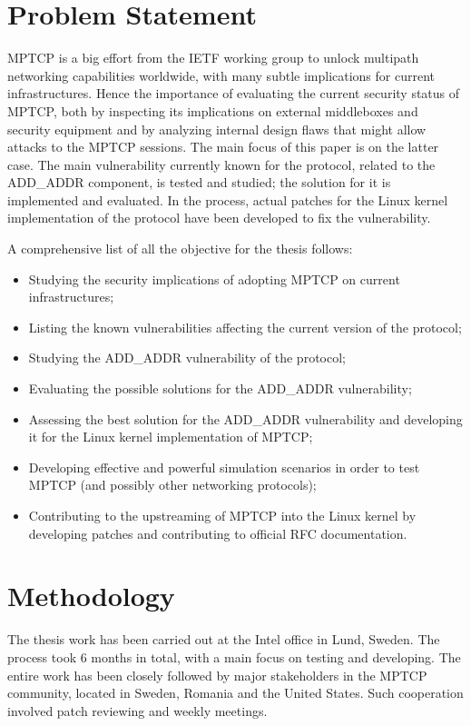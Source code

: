 \section{Problem Statement}
MPTCP is a big effort from the IETF working group to unlock multipath networking capabilities worldwide, with many subtle implications for current infrastructures. Hence the importance of evaluating the current security status of MPTCP, both by inspecting its implications on external middleboxes and security equipment and by analyzing internal design flaws that might allow attacks to the MPTCP sessions. The main focus of this paper is on the latter case. The main vulnerability currently known for the protocol, related to the ADD\_ADDR component, is tested and studied; the solution for it is implemented and evaluated. In the process, actual patches for the Linux kernel implementation of the protocol have been developed to fix the vulnerability. 


A comprehensive list of all the objective for the thesis follows:
\begin{itemize}
    \item Studying the security implications of adopting MPTCP on current infrastructures; 
    \item Listing the known vulnerabilities affecting the current version of the protocol; 
    \item Studying the ADD\_ADDR vulnerability of the protocol;
    \item Evaluating the possible solutions for the ADD\_ADDR vulnerability; 
    \item Assessing the best solution for the ADD\_ADDR vulnerability and developing it for the Linux kernel implementation of MPTCP;
    \item Developing effective and powerful simulation scenarios in order to test MPTCP (and possibly other networking protocols);
    \item Contributing to the upstreaming of MPTCP into the Linux kernel by developing patches and contributing to official RFC documentation.
\end{itemize}

\section{Methodology}
The thesis work has been carried out at the Intel office in Lund, Sweden. The process took 6 months in total, with a main focus on testing and developing. The entire work has been closely followed by major stakeholders in the MPTCP community, located in Sweden, Romania and the United States. Such cooperation involved patch reviewing and weekly meetings.


